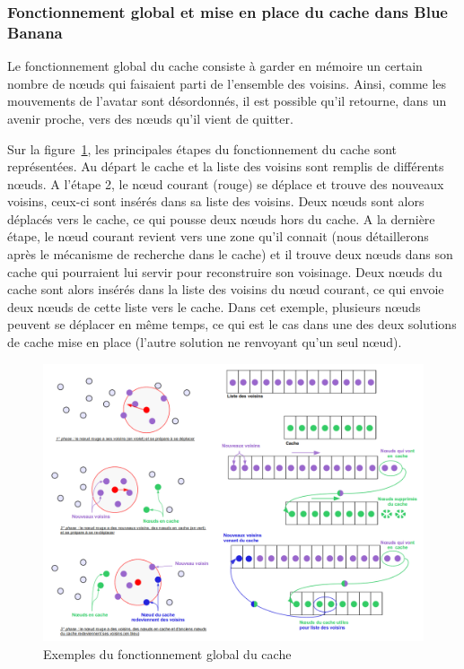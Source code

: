 \subsubsection{Fonctionnement global et mise en place du cache dans Blue Banana}
Le fonctionnement global du cache consiste à garder en mémoire un certain nombre de nœuds qui faisaient parti de l'ensemble des voisins. Ainsi, comme les mouvements de l'avatar sont désordonnés, il est possible qu'il retourne, dans un avenir proche, vers des nœuds qu'il vient de quitter. 
\par Sur la figure~\ref{cacheW}, les principales étapes du fonctionnement du cache sont représentées. Au départ le cache et la liste des voisins sont remplis de différents nœuds. A l'étape 2, le nœud courant (rouge) se déplace et trouve des nouveaux voisins, ceux-ci sont insérés dans sa liste des voisins. Deux nœuds sont alors déplacés vers le cache, ce qui pousse deux nœuds hors du cache. A la dernière étape, le nœud courant revient vers une zone qu'il connait (nous détaillerons après le mécanisme de recherche dans le cache) et il trouve deux nœuds dans son cache qui pourraient lui servir pour reconstruire son voisinage. Deux nœuds du cache sont alors insérés dans la liste des voisins du nœud courant, ce qui envoie deux nœuds de cette liste vers le cache. Dans cet exemple, plusieurs nœuds peuvent se déplacer en même temps, ce qui est le cas dans une des deux solutions de cache mise en place (l'autre solution ne renvoyant qu'un seul nœud).
	\begin{figure}[!h]
        \centering
        \includegraphics[scale=0.35]{./Ressources/Images/cacheWextends.png}
        \caption{Exemples du fonctionnement global du cache}
        \label{cacheW}
        \end{figure} 
